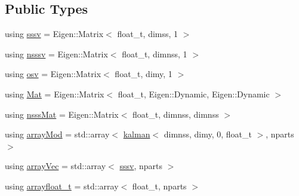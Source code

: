 \subsection*{Public Types}
\begin{DoxyCompactItemize}
\item 
using \hyperlink{classrbpf__kalman__bs_a2b40c9fa0d7a2ca42be3d0c43db0db8b}{sssv} = Eigen\+::\+Matrix$<$ float\+\_\+t, dimss, 1 $>$
\item 
using \hyperlink{classrbpf__kalman__bs_a896c6ca25182e5569df4bfa6c40f9a54}{nsssv} = Eigen\+::\+Matrix$<$ float\+\_\+t, dimnss, 1 $>$
\item 
using \hyperlink{classrbpf__kalman__bs_a51f159fe3b1d23742ba06d82d4724186}{osv} = Eigen\+::\+Matrix$<$ float\+\_\+t, dimy, 1 $>$
\item 
using \hyperlink{classrbpf__kalman__bs_add5db33a27f25ec3e72ecd8e4c9ce755}{Mat} = Eigen\+::\+Matrix$<$ float\+\_\+t, Eigen\+::\+Dynamic, Eigen\+::\+Dynamic $>$
\item 
using \hyperlink{classrbpf__kalman__bs_a0d3dfd24b849c0bf33fa3df8ce56dd07}{nsss\+Mat} = Eigen\+::\+Matrix$<$ float\+\_\+t, dimnss, dimnss $>$
\item 
using \hyperlink{classrbpf__kalman__bs_a009e7dcc39c6a256a6de6ce36df7d033}{array\+Mod} = std\+::array$<$ \hyperlink{classkalman}{kalman}$<$ dimnss, dimy, 0, float\+\_\+t $>$, nparts $>$
\item 
using \hyperlink{classrbpf__kalman__bs_ae4f4df4fb0cffea207901b0d358a519b}{array\+Vec} = std\+::array$<$ \hyperlink{classrbpf__kalman__bs_a2b40c9fa0d7a2ca42be3d0c43db0db8b}{sssv}, nparts $>$
\item 
using \hyperlink{classrbpf__kalman__bs_ae45e5522570234a1126f28fbe6a13c75}{arrayfloat\+\_\+t} = std\+::array$<$ float\+\_\+t, nparts $>$
\end{DoxyCompactItemize}
